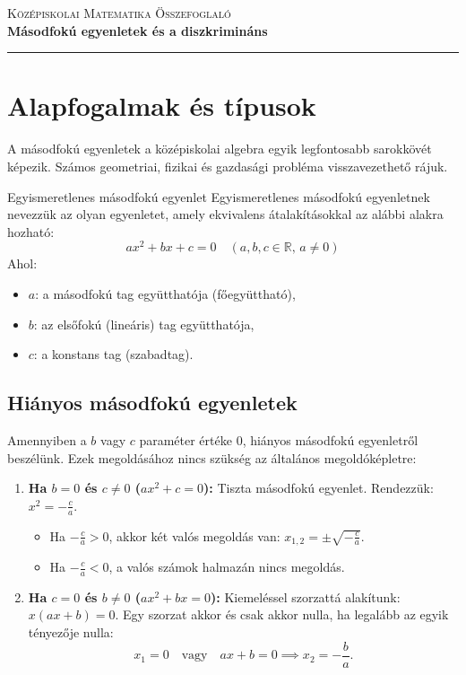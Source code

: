\documentclass[11pt,a4paper]{article}
\begin{document}
\begin{center}
    {\scshape\Large Középiskolai Matematika Összefoglaló}\\[0.2cm]
    {\Huge\bfseries\color{primaryBlue} Másodfokú egyenletek és a diszkrimináns}\\[0.3cm]
    \rule{0.8\textwidth}{1.5pt}
\end{center}

\vspace{0.2cm}

\section{Alapfogalmak és típusok}

A másodfokú egyenletek a középiskolai algebra egyik legfontosabb sarokkövét képezik. Számos geometriai, fizikai és gazdasági probléma visszavezethető rájuk.

\begin{definrans}{Egyismeretlenes másodfokú egyenlet}
    Egyismeretlenes másodfokú egyenletnek nevezzük az olyan egyenletet, amely ekvivalens átalakításokkal az alábbi alakra hozható:
    \begin{equation}
        ax^2 + bx + c = 0 \quad (a, b, c \in \mathbb{R}, \, a \neq 0)
    \end{equation}
    Ahol:
    \begin{itemize}[noitemsep,topsep=0pt]
        \item $a$: a másodfokú tag együtthatója (főegyüttható),
        \item $b$: az elsőfokú (lineáris) tag együtthatója,
        \item $c$: a konstans tag (szabadtag).
    \end{itemize}
\end{definrans}

\subsection{Hiányos másodfokú egyenletek}
Amennyiben a $b$ vagy $c$ paraméter értéke $0$, hiányos másodfokú egyenletről beszélünk. Ezek megoldásához nincs szükség az általános megoldóképletre:
\begin{enumerate}[leftmargin=*]
    \item \textbf{Ha $b = 0$ és $c \neq 0$ ($ax^2 + c = 0$):} Tiszta másodfokú egyenlet. Rendezzük: $x^2 = -\frac{c}{a}$.
    \begin{itemize}[noitemsep]
        \item Ha $-\frac{c}{a} > 0$, akkor két valós megoldás van: $x_{1,2} = \pm \sqrt{-\frac{c}{a}}$.
        \item Ha $-\frac{c}{a} < 0$, a valós számok halmazán nincs megoldás.
    \end{itemize}
    \item \textbf{Ha $c = 0$ és $b \neq 0$ ($ax^2 + bx = 0$):} Kiemeléssel szorzattá alakítunk: $x(ax + b) = 0$. Egy szorzat akkor és csak akkor nulla, ha legalább az egyik tényezője nulla:
    \[
        x_1 = 0 \quad \text{vagy} \quad ax + b = 0 \implies x_2 = -\frac{b}{a}.
    \]
\end{enumerate}
\end{document}

